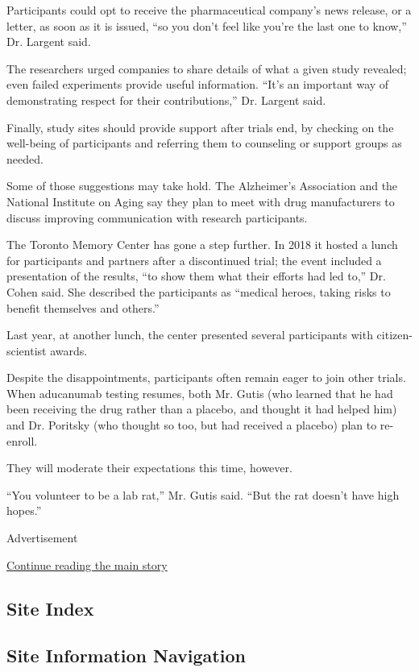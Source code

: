 Participants could opt to receive the pharmaceutical company's news
release, or a letter, as soon as it is issued, ``so you don't feel like
you're the last one to know,'' Dr. Largent said.

The researchers urged companies to share details of what a given study
revealed; even failed experiments provide useful information. ``It's an
important way of demonstrating respect for their contributions,'' Dr.
Largent said.

Finally, study sites should provide support after trials end, by
checking on the well-being of participants and referring them to
counseling or support groups as needed.

Some of those suggestions may take hold. The Alzheimer's Association and
the National Institute on Aging say they plan to meet with drug
manufacturers to discuss improving communication with research
participants.

The Toronto Memory Center has gone a step further. In 2018 it hosted a
lunch for participants and partners after a discontinued trial; the
event included a presentation of the results, ``to show them what their
efforts had led to,'' Dr. Cohen said. She described the participants as
``medical heroes, taking risks to benefit themselves and others.''

Last year, at another lunch, the center presented several participants
with citizen-scientist awards.

Despite the disappointments, participants often remain eager to join
other trials. When aducanumab testing resumes, both Mr. Gutis (who
learned that he had been receiving the drug rather than a placebo, and
thought it had helped him) and Dr. Poritsky (who thought so too, but had
received a placebo) plan to re-enroll.

They will moderate their expectations this time, however.

``You volunteer to be a lab rat,'' Mr. Gutis said. ``But the rat doesn't
have high hopes.''

Advertisement

\protect\hyperlink{after-bottom}{Continue reading the main story}

\hypertarget{site-index}{%
\subsection{Site Index}\label{site-index}}

\hypertarget{site-information-navigation}{%
\subsection{Site Information
Navigation}\label{site-information-navigation}}

